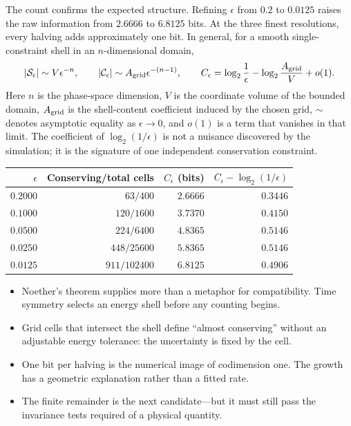 \documentclass[10pt]{article}
\newenvironment{persuasions}
  {\begin{cpbox}\small\setlength{\parskip}{0pt}%
   {\footnotesize\bfseries\color{accent}%
    \textls[110]{CONCEPTUAL PERSUASIONS}}\par\vspace{3pt}%
   \begin{itemize}[leftmargin=1.15em,itemsep=2.5pt,topsep=0pt,parsep=0pt,
                   label=\textcolor{accent}{\scriptsize$\blacktriangleright$}]}
  {\end{itemize}\end{cpbox}}
\begin{document}
The count confirms the expected structure.  Refining $\epsilon$ from $0.2$ to
$0.0125$ raises the raw information from $2.6666$ to $6.8125$ bits.  At the
three finest resolutions, every halving adds approximately one bit.  In
general, for a smooth single-constraint shell in an $n$-dimensional domain,
\begin{equation}
|\mathcal S_\epsilon|\sim V\epsilon^{-n},
\qquad
|\mathcal C_\epsilon|\sim A_{\rm grid}\epsilon^{-(n-1)},
\qquad
C_\epsilon
=\log_2\frac1\epsilon-\log_2\frac{A_{\rm grid}}V+o(1).
\label{eq:codimension-scaling}
\end{equation}
Here $n$ is the phase-space dimension, $V$ is the coordinate volume of the
bounded domain, $A_{\rm grid}$ is the shell-content coefficient induced by the
chosen grid, $\sim$ denotes asymptotic equality as $\epsilon\to0$, and $o(1)$
is a term that vanishes in that limit.  The coefficient of
$\log_2(1/\epsilon)$ is not a nuisance discovered by the
simulation; it is the signature of one independent conservation constraint.

\begin{center}
\label{tab:energy-shell}
\small
\begin{tabular}{rrrr}
\toprule
$\epsilon$ & Conserving/total cells & $C_\epsilon$ (bits) &
$C_\epsilon-\log_2(1/\epsilon)$\\
\midrule
$0.2000$ & $63/400$ & $2.6666$ & $0.3446$\\
$0.1000$ & $120/1600$ & $3.7370$ & $0.4150$\\
$0.0500$ & $224/6400$ & $4.8365$ & $0.5146$\\
$0.0250$ & $448/25600$ & $5.8365$ & $0.5146$\\
$0.0125$ & $911/102400$ & $6.8125$ & $0.4906$\\
\bottomrule
\end{tabular}
\end{center}

\begin{persuasions}
\item Noether's theorem supplies more than a metaphor for compatibility.
Time symmetry selects an energy shell before any counting begins.
\item Grid cells that intersect the shell define ``almost conserving'' without
an adjustable energy tolerance: the uncertainty is fixed by the cell.
\item One bit per halving is the numerical image of codimension one.  The
growth has a geometric explanation rather than a fitted rate.
\item The finite remainder is the next candidate---but it must still pass the
invariance tests required of a physical quantity.
\end{persuasions}
\end{document}
